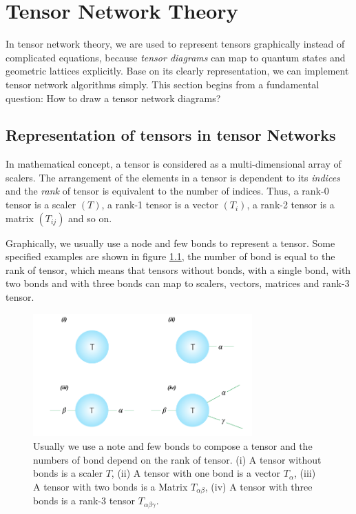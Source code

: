\chapter{Tensor Network Theory}
In tensor network theory, we are used to represent tensors graphically instead of complicated equations, because \textit{tensor diagrams} can map to quantum states and geometric lattices explicitly. Base on its clearly representation, we can implement tensor network algorithms simply. This section begins from a fundamental question: How to draw a tensor network diagrams?

\section{Representation of tensors in tensor Networks}
\label{notations}
In mathematical concept, a tensor is considered as a multi-dimensional array of scalers. The arrangement of the elements in a tensor is dependent to its \textit{indices} and the \textit{rank} of tensor is equivalent to the number of indices. Thus, a rank-0 tensor is a scaler $(T)$, a rank-1 tensor is a vector $(T_{i})$, a rank-2 tensor is a matrix $(T_{ij})$ and so on. 

Graphically, we usually use a node and few bonds to represent a tensor. Some specified examples are shown in figure \ref{fig211}, the number of bond is equal to the rank of tensor, which means that tensors without bonds, with a single bond, with two bonds and with three bonds can map to scalers, vectors, matrices and rank-3 tensor.

	\begin{figure}[ht]
	\centering
	\includegraphics[width=0.75\textwidth]{figures/fig211.png}
	\caption[The reprecentation of commen tensors.]{Usually we use a note and few bonds to compose a tensor and the numbers of bond depend on the rank of tensor. (i) A tensor without bonds is a scaler $T$, (ii) A tensor with one bond is a vector $T_{\alpha}$, (iii) A tensor with two bonds is a Matrix $T_{\alpha \beta}$, (iv) A tensor with three bonds is a rank-3 tensor $T_{\alpha \beta \gamma}$.}
	\label{fig211}
	\end{figure}

